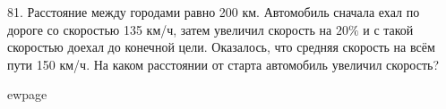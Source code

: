 81.  Расстояние между городами равно 200 км. Автомобиль сначала ехал по дороге со скоростью
135 км/ч, затем увеличил скорость на $20\%$ и с такой скоростью доехал до конечной цели. Оказалось,
что средняя скорость на всём пути 150 км/ч. На каком расстоянии от старта автомобиль увеличил
скорость?

ewpage
